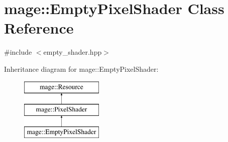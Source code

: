 \hypertarget{classmage_1_1_empty_pixel_shader}{}\section{mage\+:\+:Empty\+Pixel\+Shader Class Reference}
\label{classmage_1_1_empty_pixel_shader}


{\ttfamily \#include $<$empty\+\_\+shader.\+hpp$>$}

Inheritance diagram for mage\+:\+:Empty\+Pixel\+Shader\+:\begin{figure}[H]
\begin{center}
\leavevmode
\includegraphics[height=3.000000cm]{classmage_1_1_empty_pixel_shader}
\end{center}
\end{figure}
